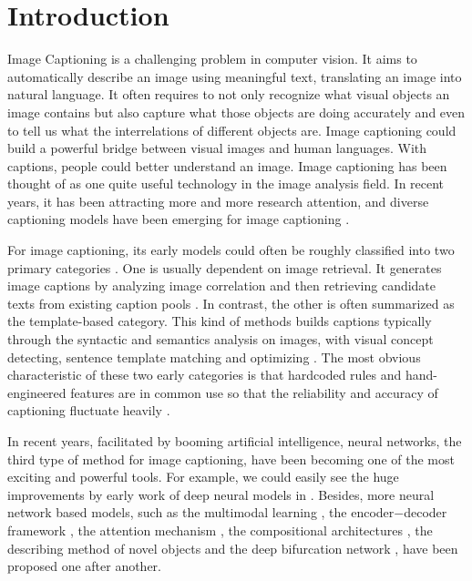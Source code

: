 \documentclass[review]{elsarticle}
\begin{document}

\section{Introduction}
Image Captioning is a challenging problem in computer vision\cite{farhadi2010every}. It aims to automatically describe an image using meaningful text, translating an image into natural language. It often requires to not only recognize what visual objects an image contains but also capture what those objects are doing accurately and even to tell us what the interrelations of different objects are. Image captioning could build a powerful bridge between visual images and human languages. With captions, people could better understand an image\cite{krishna2017visual}. Image captioning has been thought of as one quite useful technology in the image analysis field. In recent years, it has been attracting more and more research attention, and diverse captioning models have been emerging for image captioning \cite{rennie2017self, Anderson_2018_CVPR, cornia2019m, Zhangjing2021}.

For image captioning, its early models could often be roughly classified into two primary categories \cite{Baishuang2018}. One is usually dependent on image retrieval. It generates image captions by analyzing image correlation and then retrieving candidate texts from existing caption pools \cite{Ordonez2011nips, Gupta2012}. In contrast, the other is often summarized as the template-based category. This kind of methods builds captions typically through the syntactic and semantics analysis on images, with visual concept detecting, sentence template matching and optimizing \cite{socher2010connecting, Kulkarni2013, Ushiku2015}. The most obvious characteristic of these two early categories is that hardcoded rules and hand-engineered features are in common use so that the reliability and accuracy of captioning fluctuate heavily \cite{Baishuang2018}.

In recent years, facilitated by booming artificial intelligence, neural networks, the third type of method for image captioning, have been becoming one of the most exciting and powerful tools. For example, we could easily see the huge improvements by early work of deep neural models in \cite{Karpathy2014, Malin2015, Yanfei2015}. Besides, more neural network based models, such as the multimodal learning \cite{karpathy2015deep,karpathy2017deep}, the encoder$-$decoder framework \cite{vinyals2015show}, the attention mechanism \cite{Youquanzeng2016,huang2019attention}, the compositional architectures \cite{Oruganti2016}, the describing method of novel objects \cite{Maojunhua2015} and the deep bifurcation network \cite{NABATI2021115541}, have been proposed one after another.
\end{document}
